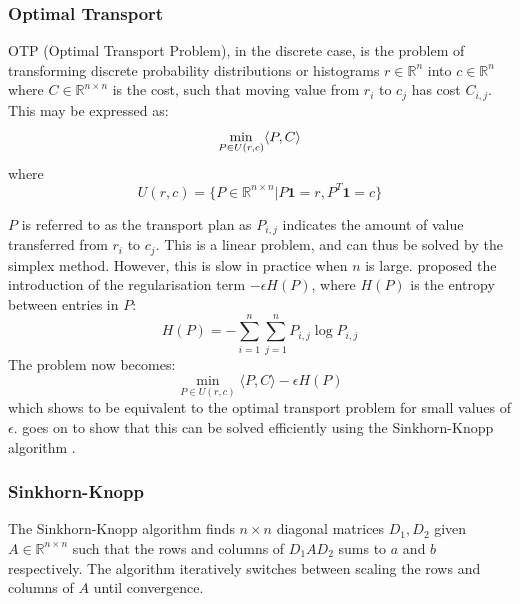 \subsubsection{Optimal Transport}
OTP (Optimal Transport Problem), in the discrete case, is the problem of transforming discrete probability distributions or histograms $r \in \mathds{R}^n$ into $c \in \mathds{R}^n$ where $C \in \mathds{R}^{n \times n}$ is the cost, such that moving value from $r_i$ to $c_j$ has cost $C_{i, j}$. This may be expressed as:
\begin{equation}
    \min_{P \in U(r, c)} \langle P, C \rangle \\  
\end{equation}
where
\begin{equation}
    U(r, c) = \{ P \in \mathds{R}^{n \times n} | P\boldsymbol{1} = r, P^T\boldsymbol{1} = c \}
\end{equation}

$P$ is referred to as the transport plan as $P_{i, j}$ indicates the amount of value transferred from $r_i$ to $c_j$. This is a linear problem, and can thus be solved by the simplex method. However, this is slow in practice when $n$ is large. \cite{cuturi2013sinkhorn} proposed the introduction of the regularisation term $-\epsilon H(P)$, where $H(P)$ is the entropy between entries in $P$:
\begin{equation}
    H(P) = -\sum^{n}_{i = 1} \sum^{n}_{j = 1} P_{i, j} \log P_{i, j}
\end{equation}
The problem now becomes:
\begin{equation}
    \min_{P \in U(r, c)} \langle P, C \rangle - \epsilon H(P)
\end{equation} 
which \cite{cuturi2013sinkhorn} shows to be equivalent to the optimal transport problem for small values of $\epsilon$. \cite{cuturi2013sinkhorn} goes on to show that this can be solved efficiently using the Sinkhorn-Knopp algorithm \citep{sinkhorn1967concerning}.

\subsubsection{Sinkhorn-Knopp}
The Sinkhorn-Knopp algorithm \citep{sinkhorn1967concerning} finds $n \times n$ diagonal matrices $D_1, D_2$ given $A \in \mathds{R}^{n \times n}$ such that the rows and columns of $D_1 A D_2$ sums to $a$ and $b$ respectively. The algorithm iteratively switches between scaling the rows and columns of $A$ until convergence.

